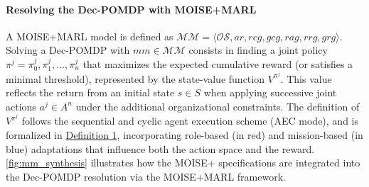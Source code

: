 \paragraph{\textbf{Resolving the Dec-POMDP with MOISE+MARL}}

A MOISE+MARL model is defined as $\mathcal{MM} = \langle \mathcal{OS}, ar, rcg, gcg, rag, rrg, grg \rangle$.
Solving a Dec-POMDP with $mm \in \mathcal{MM}$ consists in finding a joint policy $\pi^j = {\pi^j_0, \pi^j_1, \dots, \pi^j_n}$ that maximizes the expected cumulative reward (or satisfies a minimal threshold), represented by the state-value function $V^{\pi^j}$. This value reflects the return from an initial state $s \in S$ when applying successive joint actions $a^j \in A^n$ under the additional organizational constraints.
%
The definition of $V^{\pi^j}$ follows the sequential and cyclic agent execution scheme (AEC mode), and is formalized in \hyperref[eq:single_value_function]{Definition 1}, incorporating role-based (in red) and mission-based (in blue) adaptations that influence both the action space and the reward.
\autoref{fig:mm_synthesis} illustrates how the MOISE+ specifications are integrated into the Dec-POMDP resolution via the MOISE+MARL framework.



